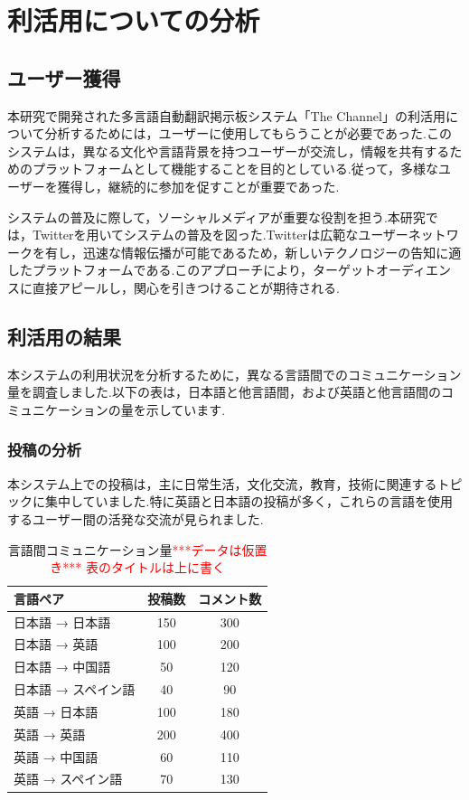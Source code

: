 \documentclass[b5paper,12pt,dvipdfmx]{jsreport}
\newcommand{\red}[1]{\textcolor{red}{#1}}
\begin{document}
\chapter{利活用についての分析}

\section{ユーザー獲得}

本研究で開発された多言語自動翻訳掲示板システム「The Channel」の利活用について分析するためには，ユーザーに使用してもらうことが必要であった.このシステムは，異なる文化や言語背景を持つユーザーが交流し，情報を共有するためのプラットフォームとして機能することを目的としている.従って，多様なユーザーを獲得し，継続的に参加を促すことが重要であった.

システムの普及に際して，ソーシャルメディアが重要な役割を担う.本研究では，Twitterを用いてシステムの普及を図った.Twitterは広範なユーザーネットワークを有し，迅速な情報伝播が可能であるため，新しいテクノロジーの告知に適したプラットフォームである.このアプローチにより，ターゲットオーディエンスに直接アピールし，関心を引きつけることが期待される.

\section{利活用の結果}
本システムの利用状況を分析するために，異なる言語間でのコミュニケーション量を調査しました.以下の表は，日本語と他言語間，および英語と他言語間のコミュニケーションの量を示しています.


\subsection{投稿の分析}
本システム上での投稿は，主に日常生活，文化交流，教育，技術に関連するトピックに集中していました.特に英語と日本語の投稿が多く，これらの言語を使用するユーザー間の活発な交流が見られました.

\begin{table}[H]
    \centering
    \begin{tabular}{|l|c|c|}
        \hline
        \textbf{言語ペア} & \textbf{投稿数} & \textbf{コメント数} \\
        \hline
        日本語 → 日本語 & 150 & 300 \\
        日本語 → 英語   & 100 & 200 \\
        日本語 → 中国語 & 50  & 120 \\
        日本語 → スペイン語 & 40  & 90 \\
        英語 → 日本語   & 100 & 180 \\
        英語 → 英語     & 200 & 400 \\
        英語 → 中国語   & 60  & 110 \\
        英語 → スペイン語 & 70  & 130 \\
        \hline
    \end{tabular}
    \caption{言語間コミュニケーション量\red{***データは仮置き*** 表のタイトルは上に書く}}
    \label{table:language-communication}
\end{table}
\end{document}
